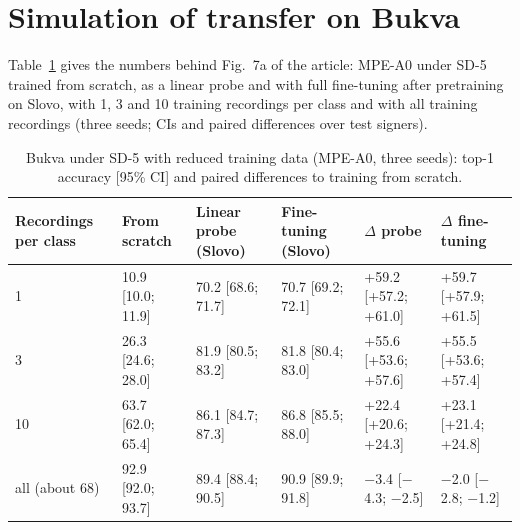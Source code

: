 \documentclass[a4paper,10pt]{article}
\begin{document}
\section{Simulation of transfer on Bukva}
Table~\ref{tab:s_few} gives the numbers behind Fig.~7a of the article: MPE-A0 under SD-5 trained from scratch, as a linear probe and with full fine-tuning after pretraining on Slovo, with 1, 3 and 10 training recordings per class and with all training recordings (three seeds; CIs and paired differences over test signers).
\begin{table}[H]
\caption{Bukva under SD-5 with reduced training data (MPE-A0, three seeds): top-1 accuracy [95\% CI] and paired differences to training from scratch.}\label{tab:s_few}
\centering
\scriptsize\setlength{\tabcolsep}{3pt}
\begin{tabular}{llllll}
\toprule
\textbf{Recordings per class} & \textbf{From scratch} & \textbf{Linear probe (Slovo)} & \textbf{Fine-tuning (Slovo)} & \textbf{$\Delta$ probe} & \textbf{$\Delta$ fine-tuning} \\
\midrule
1 & 10.9 [10.0; 11.9] & 70.2 [68.6; 71.7] & 70.7 [69.2; 72.1] & +59.2 [+57.2; +61.0] & +59.7 [+57.9; +61.5] \\
3 & 26.3 [24.6; 28.0] & 81.9 [80.5; 83.2] & 81.8 [80.4; 83.0] & +55.6 [+53.6; +57.6] & +55.5 [+53.6; +57.4] \\
10 & 63.7 [62.0; 65.4] & 86.1 [84.7; 87.3] & 86.8 [85.5; 88.0] & +22.4 [+20.6; +24.3] & +23.1 [+21.4; +24.8] \\
all (about 68) & 92.9 [92.0; 93.7] & 89.4 [88.4; 90.5] & 90.9 [89.9; 91.8] & $-$3.4 [$-$4.3; $-$2.5] & $-$2.0 [$-$2.8; $-$1.2] \\
\bottomrule
\end{tabular}
\end{table}
\end{document}

